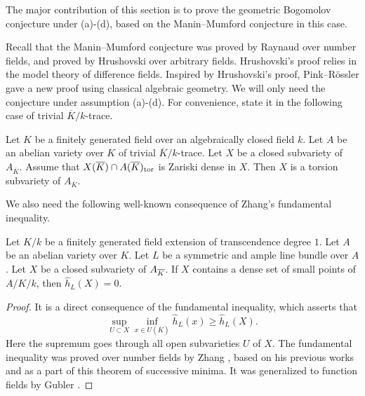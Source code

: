 The major contribution of this section is to prove the geometric Bogomolov conjecture
under (a)-(d), based on the Manin--Mumford conjecture in this case.

Recall that the Manin--Mumford conjecture was proved by Raynaud \cite{Raynaud1983,Raynaud1983a} over number fields, and proved by Hrushovski \cite{Hrushovski2001} over arbitrary fields.  Hrushovski's proof relies in the model theory of difference fields. Inspired by Hrushovski's proof, Pink--R\"ossler \cite{Pink2002a,Pink2004} gave a new proof using classical algebraic geometry. We will only need the conjecture under assumption (a)-(d).
For convenience, state it in the following case of trivial $\overline K/k$-trace.

\begin{thm}
\notready \label{MM}
Let $K$ be a finitely generated field over an algebraically closed field $k$. Let $A$ be an abelian variety over $K$ of trivial $\overline K/ k$-trace.
Let $X$ be a closed subvariety of $A_{\overline K}$.
Assume that $X(\overline K)\cap A(\overline K)_{\mathrm{tor}}$ is Zariski dense in $X$.
Then $X$ is a torsion subvariety of $A_{\overline K}$.
\end{thm}

We also need the following well-known consequence of Zhang's fundamental inequality.

\begin{lem}
\notready\label{fundamental inequality}
Let $K/k$ be a finitely generated field extension of transcendence degree $1$.
Let $A$ be an abelian variety over $K$. Let $L$ be a symmetric and ample line bundle over $A$.
Let $X$ be a closed subvariety of $A_{\overline{K}}$.
If $X$ contains a dense set of small points of $A/K/k$, then $\widehat h_L(X)=0$.
\end{lem}
\begin{proof}
It is a direct consequence of the fundamental inequality, which asserts that
$$
\sup_{U\subset X} \inf_{x\in U(\overline K)}
\widehat h_L(x)
\geq   \widehat h_L(X).$$
Here the supremum goes through all open subvarieties $U$ of $X$.
The fundamental inequality was proved over number fields by Zhang \cite[Theorem 1.10]{Zhang1995}, based on his previous works \cite{Zhang1992,Zhang1995a} and as a part of this theorem of successive minima.
It was generalized to function fields by Gubler \cite[Lemma 4.1]{Gubler2007}.
\end{proof}





